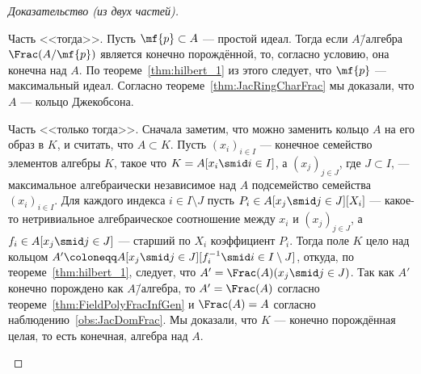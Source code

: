 \documentclass[
	extrafontsizes,
	11pt,
	hyphens,
]{memoir}
\begin{document}
\begin{proof}[Доказательство (из двух частей)]
~\begin{proofdescription}

\item[Часть <<тогда>>.]
Пусть \(\mf{p} \subset A\) --- простой идеал.
Тогда если \(A\)\=/алгебра \(\Frac(A / \mf{p})\) является конечно порождённой, то, согласно условию, она конечна над \(A\). По теореме~\ref{thm:hilbert_1} из этого следует, что \(\mf{p}\) --- максимальный идеал.
Согласно теореме~\ref{thm:JacRingCharFrac} мы доказали, что \(A\) --- кольцо Джекобсона.


\item[Часть <<только тогда>>.]
Сначала заметим, что можно заменить кольцо \(A\) на его образ в \(K\), и считать, что \(A \subset K\).
Пусть \((x_i)_{i \in I}\) --- конечное семейство элементов алгебры \(K\),
такое что \(K = A[x_i \smid i \in I]\),
а \((x_j)_{j \in J}\), где \(J \subset I\), --- максимальное алгебраически независимое над \(A\) подсемейство семейства \((x_i)_{i \in I}\).
Для каждого индекса \(i \in I \setminus J\) пусть \(P_i \in A[x_j \smid j \in J][X_i]\) --- какое-то нетривиальное алгебраическое соотношение между \(x_i\) и \((x_j)_{j \in J}\),
а \(f_i \in A[x_j \smid j \in J]\) --- старший по \(X_i\) коэффициент \(P_i\).
Тогда поле \(K\) цело над кольцом \(A' \coloneqq A[x_j \smid j \in J][f_i^{-1} \smid i \in I \setminus J]\), откуда, по теореме~\ref{thm:hilbert_1}, следует, что \(A' = \Frac(A)(x_j \smid j \in J)\).
Так как \(A'\) конечно порождено как \(A\)\=/алгебра,
то \(A' = \Frac(A)\) согласно теореме~\ref{thm:FieldPolyFracInfGen} и \(\Frac(A) = A\) согласно наблюдению~\ref{obs:JacDomFrac}.
Мы доказали, что \(K\) --- конечно порождённая целая, то есть конечная, алгебра над \(A\).
\qedhere

\end{proofdescription}
\end{proof}
\end{document}
